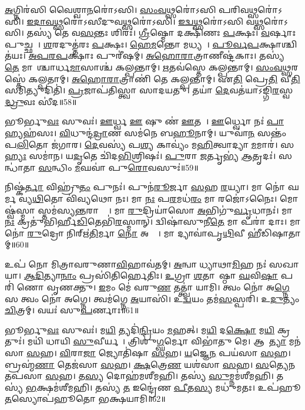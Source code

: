 \ul{𑌅}𑌗𑍍𑌨𑌿𑌰॑𑌸𑌿 𑌵𑍈𑌶𑍍𑌵𑌾\ul{𑌨}𑌰𑍋॑𑌽𑌸𑌿। 
\ul{𑌸𑌂}\ul{𑌵}\ul{𑌥𑍍𑌸}𑌰𑍋॑𑌽𑌸𑌿 𑌪𑌰𑌿𑌵\ul{𑌥𑍍𑌸}𑌰𑍋॑𑌽𑌸𑌿। 
\ul{𑌇}\ul{𑌦𑌾}\ul{𑌵}\ul{𑌥𑍍𑌸}𑌰𑍋॑𑌽𑌸𑍀𑌦𑍁𑌵\ul{𑌥𑍍𑌸}𑌰𑍋॑𑌽𑌸𑌿। 
\ul{𑌇}\ul{𑌦𑍍𑌵}\ul{𑌥𑍍𑌸}𑌰𑍋॑𑌽𑌸𑌿 𑌵\ul{𑌥𑍍𑌸}𑌰𑍋॑𑌽𑌸𑌿। 
𑌤𑌸𑍍𑌯॑ 𑌤𑍇 𑌵\ul{𑌸}𑌨𑍍𑌤𑌃  𑌶𑌿𑌰𑌃॑। 
\ul{𑌗𑍍𑌰𑍀}𑌷𑍍𑌮𑍋 𑌦𑌕𑍍𑌷𑌿॑𑌣𑌃 \ul{𑌪}𑌕𑍍𑌷𑌃। 
\ul{𑌵}𑌰𑍍\mbox{}𑌷𑌾𑌃 𑌪𑍁𑌚𑍍𑌛𑌮𑍍᳚। 
\ul{𑌶}𑌰𑌦𑍁𑌤𑍍𑌤॑𑌰𑌃 \ul{𑌪}𑌕𑍍𑌷𑌃। 
\ul{𑌹𑍇}\ul{𑌮}𑌨𑍍𑌤𑍋 𑌮𑌧𑍍𑌯𑌮𑍍᳚। 
\ul{𑌪𑍂}\ul{𑌰𑍍𑌵}\ul{𑌪}𑌕𑍍𑌷𑌾𑌶𑍍𑌚𑌿𑌤॑𑌯𑌃। 
\ul{𑌅}\ul{𑌪}\ul{𑌰}\ul{𑌪}𑌕𑍍𑌷𑌾𑌃 𑌪𑍁𑌰𑍀॑𑌷𑌮𑍍। 
\ul{𑌅}\ul{𑌹𑍋}\ul{𑌰𑌾}𑌤𑍍𑌰𑌾𑌣𑍀𑌷𑍍𑌟॑𑌕𑌾𑌃। 
𑌤𑌸𑍍𑌯॑ \ul{𑌤𑍇} 𑌮𑌾𑌸𑌾᳚𑌶𑍍𑌚𑌾𑌰𑍍𑌧\ul{𑌮𑌾}𑌸𑌾𑌶𑍍𑌚॑ 𑌕𑌲𑍍𑌪𑌨𑍍𑌤𑌾𑌮𑍍। 
\ul{𑌋}𑌤𑌵॑𑌸𑍍𑌤𑍇 𑌕𑌲𑍍𑌪𑌨𑍍𑌤𑌾𑌮𑍍। 
\ul{𑌸𑌂}\ul{𑌵}\ul{𑌥𑍍𑌸}𑌰𑌸𑍍𑌤𑍇॑ 𑌕𑌲𑍍𑌪𑌤𑌾𑌮𑍍। 
\ul{𑌅}\ul{𑌹𑍋}\ul{𑌰𑌾}𑌤𑍍𑌰𑌾𑌣𑌿॑ 𑌤𑍇 𑌕𑌲𑍍𑌪𑌨𑍍𑌤𑌾𑌮𑍍। 
𑌏\ul{𑌤𑌿} 𑌪𑍍𑌰𑍇\ul{𑌤𑌿} 𑌵𑍀\ul{𑌤𑌿} 𑌸𑌮𑌿𑌤𑍍𑌯𑍁𑌦𑌿𑌤𑌿॑। 
\ul{𑌪𑍍𑌰}𑌜𑌾𑌪॑𑌤𑌿𑌸𑍍𑌤𑍍𑌵𑌾 𑌸𑌾𑌦𑌯𑌤𑍁। 
𑌤𑌯𑌾॑ \ul{𑌦𑍇}𑌵𑌤॑𑌯𑌾𑌽𑌙𑍍𑌗𑌿\ul{𑌰}𑌸𑍍𑌵\ul{𑌦𑍍𑌧𑍍𑌰𑍁}𑌵𑌃 𑌸𑍀॑𑌦॥58॥
\anuvakamend[𑌚𑌿𑌤॑\ul{𑌯𑍋} 𑌨𑌵॑ 𑌚]


𑌭𑍂𑌰𑍍𑌭𑍁\ul{𑌵𑌃} 𑌸𑍁𑌵𑌃॑। 
\ul{𑌊}𑌰𑍍𑌧𑍍𑌵 \ul{𑌊} 𑌷𑍁 𑌣॑ \ul{𑌊}𑌤𑌯𑍇᳚। 
\ul{𑌊}𑌰𑍍𑌧𑍍𑌵𑍋 𑌨𑌃॑ \ul{𑌪𑌾}𑌹𑍍𑌯𑌹॑𑌸𑌃। 
\ul{𑌵𑌿}𑌧𑍁𑌨𑍍𑌦॑\ul{𑌦𑍍𑌰𑌾}𑌣 𑌸𑌮॑𑌨𑍇 𑌬\ul{𑌹𑍂}𑌨𑌾𑌮𑍍। 
𑌯𑍁𑌵𑌾॑\ul{𑌨}\ul{} 𑌸𑌨𑍍𑌤𑌂॑ 𑌪\ul{𑌲𑌿}𑌤𑍋 𑌜॑𑌗𑌾𑌰। 
\ul{𑌦𑍇}𑌵𑌸𑍍𑌯॑ 𑌪\ul{𑌶𑍍𑌯} 𑌕𑌾𑌵𑍍𑌯𑌂॑ 𑌮\ul{𑌹𑌿}𑌤𑍍𑌵𑌾𑌦𑍍𑌯𑌾 \ul{𑌮}𑌮𑌾𑌰॑। 
𑌸\ul{𑌹𑍍𑌯𑌃} 𑌸𑌮𑌾॑𑌨। 
𑌯\ul{𑌦𑍃}𑌤𑍇 𑌚𑌿॑𑌦\ul{𑌭𑌿}𑌶𑍍𑌰𑌿𑌷𑌃॑। 
\ul{𑌪𑍁}𑌰𑌾 \ul{𑌜}𑌰𑍍𑌤𑍃𑌭𑍍𑌯॑ \ul{𑌆}𑌤𑍃𑌦𑌃॑। 
𑌸𑌨𑍍𑌧𑌾॑𑌤𑌾 \ul{𑌸}𑌨𑍍𑌧𑌿𑌂 \ul{𑌮}𑌘𑌵𑌾॑ 𑌪𑍁\ul{𑌰𑍋}𑌵𑌸𑍁𑌃॑॥59॥

𑌨𑌿𑌷𑍍𑌕॑\ul{𑌰𑍍𑌤𑌾} 𑌵𑌿𑌹𑍍𑌰𑍁॑\ul{𑌤𑌂} 𑌪𑍁𑌨𑌃॑। 
𑌪𑍁𑌨॑\ul{𑌰𑍂}𑌰𑍍𑌜𑌾 \ul{𑌸}𑌹 \ul{𑌰}𑌯𑍍𑌯𑌾। 
𑌮𑌾 𑌨𑍋॑ 𑌘𑌰𑍍𑌮 𑌵𑍍𑌯\ul{𑌥𑌿}𑌤𑍋 𑌵𑌿॑𑌵𑍍𑌯𑌥𑍋 𑌨𑌃। 
𑌮𑌾 \ul{𑌨𑌃} 𑌪\ul{𑌰}𑌮𑌧॑\ul{𑌰𑌂} 𑌮𑌾 𑌰𑌜𑍋॑𑌽𑌨𑍈𑌃। 
𑌮𑍋𑌷𑍍𑌵॑𑌸𑍍𑌮𑌾 𑌸𑍍𑌤𑌮॑𑌸𑍍𑌯\ul{𑌨𑍍𑌤}𑌰𑌾 𑌧𑌾𑌃᳚। 
𑌮𑌾 \ul{𑌰𑍁}𑌦𑍍𑌰𑌿𑌯𑌾॑𑌸𑍋 \ul{𑌅}𑌭𑌿𑌗𑍁॑\ul{𑌰𑍍𑌵𑍃}𑌧𑌾𑌨𑌃॑। 
𑌮𑌾 \ul{𑌨𑌃} 𑌕𑍍𑌰𑌤𑍁॑𑌭𑌿𑌰𑍍\mbox{}𑌹𑍀\ul{𑌡𑌿}𑌤𑍇𑌭𑌿॑\ul{𑌰}𑌸𑍍𑌮𑌾𑌨𑍍। 
𑌦𑍍𑌵𑌿𑌷𑌾॑𑌸𑍁𑌨𑍀\ul{𑌤𑍇} 𑌮𑌾 𑌪𑌰𑌾॑ 𑌦𑌾𑌃। 
𑌮𑌾 𑌨𑍋॑ \ul{𑌰𑍁}𑌦𑍍𑌰𑍋 𑌨𑌿𑌰𑍍\mbox{}𑌋॑\ul{𑌤𑌿}𑌰𑍍𑌮𑌾 \ul{𑌨𑍋} 𑌅𑌸𑍍𑌤𑌾᳚। 
𑌮𑌾 𑌦𑍍𑌯𑌾𑌵𑌾॑𑌪𑍃\ul{𑌥𑌿}𑌵𑍀 𑌹𑍀॑𑌡𑌿𑌷𑌾𑌤𑌾𑌮𑍍॥60॥

𑌉𑌪॑ 𑌨𑍋 𑌮𑌿𑌤𑍍𑌰𑌾𑌵𑌰𑍁𑌣𑌾\ul{𑌵𑌿}𑌹𑌾𑌵॑𑌤𑌮𑍍। 
\ul{𑌅}𑌨𑍍𑌵𑌾𑌦𑍀᳚𑌧𑍍𑌯𑌾𑌥𑌾\ul{𑌮𑌿}𑌹 𑌨𑌃॑ 𑌸𑌖𑌾𑌯𑌾। 
\ul{𑌆}\ul{𑌦𑌿}𑌤𑍍𑌯𑌾\ul{𑌨𑌾𑌂} 𑌪𑍍𑌰𑌸𑌿॑𑌤𑌿𑌰𑍍\mbox{}\ul{𑌹𑍇}𑌤𑌿𑌃। 
\ul{𑌉}𑌗𑍍𑌰𑌾 \ul{𑌶}𑌤𑌾𑌪𑌾᳚𑌷𑍍𑌠𑌾 \ul{𑌘}𑌵𑌿\ul{𑌷𑌾} 𑌪𑌰𑌿॑ 𑌣𑍋 𑌵𑍃𑌣𑌕𑍍𑌤𑍁। 
\ul{𑌇}𑌮𑌂 𑌮𑍇॑ 𑌵𑌰𑍁\ul{𑌣} 𑌤𑌤𑍍𑌤𑍍𑌵𑌾॑ 𑌯𑌾𑌮𑌿। 
𑌤𑍍𑌵𑌂 𑌨𑍋॑ 𑌅\ul{𑌗𑍍𑌨𑍇} 𑌸 𑌤𑍍𑌵𑌂 𑌨𑍋॑ 𑌅𑌗𑍍𑌨𑍇। 
𑌤𑍍𑌵𑌮॑𑌗𑍍𑌨𑍇 \ul{𑌅}𑌯𑌾𑌸𑌿॑। 
𑌉\ul{𑌦𑍍𑌵}𑌯𑌂 𑌤𑌮॑\ul{𑌸}𑌸𑍍𑌪𑌰𑌿॑। 
𑌉\ul{𑌦𑍁}𑌤𑍍𑌯𑌂 \ul{𑌚𑌿}𑌤𑍍𑌰𑌮𑍍। 
𑌵𑌯𑌃॑ 𑌸𑍁\ul{𑌪}𑌰𑍍𑌣𑌾𑌃॥61॥


𑌭𑍂𑌰𑍍𑌭𑍁\ul{𑌵𑌃} 𑌸𑍁𑌵𑌃॑। 
𑌮\ul{𑌯𑌿} 𑌤𑍍𑌯𑌦𑌿॑\ul{𑌨𑍍𑌦𑍍𑌰𑌿}𑌯𑌂 \ul{𑌮}𑌹𑌤𑍍। 
𑌮\ul{𑌯𑌿} 𑌦\ul{𑌕𑍍𑌷𑍋} 𑌮\ul{𑌯𑌿} 𑌕𑍍𑌰𑌤𑍁𑌃॑। 
𑌮𑌯𑌿॑ 𑌧𑌾𑌯𑌿 \ul{𑌸𑍁}𑌵𑍀𑌰𑍍𑌯𑌮𑍍᳚। 
𑌤𑍍𑌰𑌿𑌶𑍁॑\ul{𑌗𑍍𑌘}𑌰𑍍𑌮𑍋 𑌵𑌿𑌭𑌾॑𑌤𑍁 𑌮𑍇। 
𑌆𑌕𑍂᳚\ul{𑌤𑍍𑌯𑌾} 𑌮𑌨॑𑌸𑌾 \ul{𑌸}𑌹। 
\ul{𑌵𑌿}𑌰𑌾\ul{𑌜𑌾} 𑌜𑍍𑌯𑍋𑌤𑌿॑𑌷𑌾 \ul{𑌸}𑌹। 
\ul{𑌯}𑌜𑍍𑌞𑍇\ul{𑌨} 𑌪𑌯॑𑌸𑌾 \ul{𑌸}𑌹। 
𑌬𑍍𑌰𑌹𑍍𑌮॑\ul{𑌣𑌾} 𑌤𑍇𑌜॑𑌸𑌾 \ul{𑌸}𑌹। 
\ul{𑌕𑍍𑌷}𑌤𑍍𑌰𑍇\ul{𑌣} 𑌯𑌶॑𑌸𑌾 \ul{𑌸}𑌹। 
\ul{𑌸}𑌤𑍍𑌯𑍇\ul{𑌨} 𑌤𑌪॑𑌸𑌾 \ul{𑌸}𑌹। 
𑌤\ul{𑌸𑍍𑌯} 𑌦𑍋𑌹॑𑌮𑌶𑍀𑌮𑌹𑌿। 
𑌤𑌸𑍍𑌯॑ \ul{𑌸𑍁}𑌮𑍍𑌨𑌮॑𑌶𑍀𑌮𑌹𑌿। 
𑌤𑌸𑍍𑌯॑ \ul{𑌭}𑌕𑍍𑌷𑌮॑𑌶𑍀𑌮𑌹𑌿। 
𑌤𑌸𑍍𑌯॑ \ul{𑌤} 𑌇𑌨𑍍𑌦𑍍𑌰𑍇॑𑌣 \ul{𑌪𑍀}𑌤\ul{𑌸𑍍𑌯} 𑌮𑌧𑍁॑𑌮𑌤𑌃। 
𑌉𑌪॑𑌹𑍂\ul{𑌤}𑌸𑍍𑌯𑍋𑌪॑𑌹𑍂𑌤𑍋 𑌭𑌕𑍍𑌷𑌯𑌾𑌮𑌿॥62॥
\anuvakamend[𑌯𑌶॑𑌸𑌾 \ul{𑌸}𑌹 𑌷𑌟𑍍𑌚॑]

